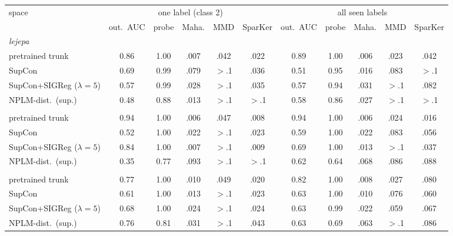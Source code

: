 \begin{table}[t]
\centering
\footnotesize
\begin{tabular}{lcccccccccc}
\toprule
space & \multicolumn{5}{c}{one label (class 2)} & \multicolumn{5}{c}{all seen labels} \\
\cmidrule(lr){2-6}\cmidrule(lr){7-11}
& out.\ AUC & probe & Maha. & MMD & SparKer & out.\ AUC & probe & Maha. & MMD & SparKer \\
\midrule
\multicolumn{11}{l}{\emph{lejepa}} \\
\quad pretrained trunk & 0.86 & 1.00 & .007 & .042 & .022 & 0.89 & 1.00 & .006 & .023 & .042 \\
\quad SupCon & 0.69 & 0.99 & .079 & $>$.1 & .036 & 0.51 & 0.95 & .016 & .083 & $>$.1 \\
\quad SupCon+SIGReg ($\lambda{=}5$) & 0.57 & 0.99 & .028 & $>$.1 & .035 & 0.57 & 0.94 & .031 & $>$.1 & .082 \\
\quad NPLM-dist.\ (sup.) & 0.48 & 0.88 & .013 & $>$.1 & $>$.1 & 0.58 & 0.86 & .027 & $>$.1 & $>$.1 \\
\addlinespace
\multicolumn{11}{l}{\emph{visreg}} \\
\quad pretrained trunk & 0.94 & 1.00 & .006 & .047 & .008 & 0.94 & 1.00 & .006 & .024 & .016 \\
\quad SupCon & 0.52 & 1.00 & .022 & $>$.1 & .023 & 0.59 & 1.00 & .022 & .083 & .056 \\
\quad SupCon+SIGReg ($\lambda{=}5$) & 0.84 & 1.00 & .007 & $>$.1 & .009 & 0.69 & 1.00 & .013 & $>$.1 & .037 \\
\quad NPLM-dist.\ (sup.) & 0.35 & 0.77 & .093 & $>$.1 & $>$.1 & 0.62 & 0.64 & .068 & .086 & .088 \\
\addlinespace
\multicolumn{11}{l}{\emph{dino}} \\
\quad pretrained trunk & 0.77 & 1.00 & .010 & .049 & .020 & 0.82 & 1.00 & .008 & .027 & .080 \\
\quad SupCon & 0.61 & 1.00 & .013 & $>$.1 & .023 & 0.63 & 1.00 & .010 & .076 & .060 \\
\quad SupCon+SIGReg ($\lambda{=}5$) & 0.68 & 1.00 & .024 & $>$.1 & .024 & 0.63 & 0.99 & .022 & .059 & .067 \\
\quad NPLM-dist.\ (sup.) & 0.76 & 0.81 & .031 & $>$.1 & .043 & 0.63 & 0.69 & .063 & $>$.1 & .086 \\

\end{tabular}
\end{table}
